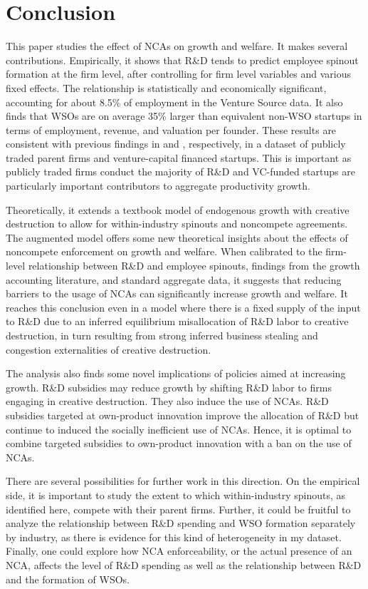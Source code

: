 \documentclass[ecta,nameyear,final]{econsocart}
\theoremstyle{plain}
\theoremstyle{remark}
\begin{document}
\section{Conclusion}\label{sec:conclusion}

This paper studies the effect of NCAs on growth and welfare. It makes several contributions. Empirically, it shows that R\&D tends to predict employee spinout formation at the firm level, after controlling for firm level variables and various fixed effects. The relationship is statistically and economically significant, accounting for about 8.5\% of employment in the Venture Source data. It also finds that WSOs are on average 35\% larger than equivalent non-WSO startups in terms of employment, revenue, and valuation per founder. These results are consistent with previous findings in \cite{babina_entrepreneurial_2019} and \cite{muendler_employee_2012}, respectively, in a dataset of publicly traded parent firms and venture-capital financed startups. This is important as publicly traded firms conduct the majority of R\&D and VC-funded startups are particularly important contributors to aggregate productivity growth. 

Theoretically, it extends a textbook model of endogenous growth with creative destruction to allow for within-industry spinouts and noncompete agreements. The augmented model offers some new theoretical insights about the effects of noncompete enforcement on growth and welfare. When calibrated to the firm-level relationship between R\&D and employee spinouts, findings from the growth accounting literature, and standard aggregate data, it suggests that reducing barriers to the usage of NCAs can significantly increase growth and welfare. It reaches this conclusion even in a model where there is a fixed supply of the input to R\&D due to an inferred equilibrium misallocation of R\&D labor to creative destruction, in turn resulting from strong inferred business stealing and congestion externalities of creative destruction.

The analysis also finds some novel implications of policies aimed at increasing growth. R\&D subsidies may reduce growth by shifting R\&D labor to firms engaging in creative destruction. They also induce the use of NCAs. R\&D subsidies targeted at own-product innovation improve the allocation of R\&D but continue to induced the socially inefficient use of NCAs. Hence, it is optimal to combine targeted subsidies to own-product innovation with a ban on the use of NCAs. 

There are several possibilities for further work in this direction. On the empirical side, it is important to study the extent to which within-industry spinouts, as identified here, compete with their parent firms. Further, it could be fruitful to analyze the relationship between R\&D spending and WSO formation separately by industry, as there is evidence for this kind of heterogeneity in my dataset. Finally, one could explore how NCA enforceability, or the actual presence of an NCA, affects the level of R\&D spending as well as the relationship between R\&D and the formation of WSOs.
\end{document}
